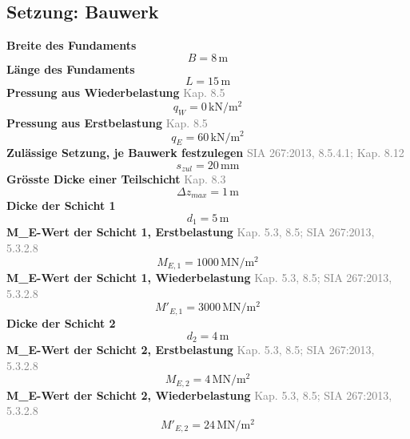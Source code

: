 \documentclass[11pt,a4paper]{article}
\newcommand{\normref}[1]{{\small\textcolor{gray}{#1}}}
\begin{document}
\subsection{Setzung: Bauwerk}
\noindent\textbf{Breite des Fundaments}
\begin{equation*}
B = 8\,\mathrm{m}
\end{equation*}
\noindent\textbf{Länge des Fundaments}
\begin{equation*}
L = 15\,\mathrm{m}
\end{equation*}
\noindent\textbf{Pressung aus Wiederbelastung} \hfill \normref{Kap. 8.5}
\begin{equation*}
q_W = 0\,\mathrm{kN}/\mathrm{m}^{2}
\end{equation*}
\noindent\textbf{Pressung aus Erstbelastung} \hfill \normref{Kap. 8.5}
\begin{equation*}
q_E = 60\,\mathrm{kN}/\mathrm{m}^{2}
\end{equation*}
\noindent\textbf{Zulässige Setzung, je Bauwerk festzulegen} \hfill \normref{SIA 267:2013, 8.5.4.1; Kap. 8.12}
\begin{equation*}
s_{zul} = 20\,\mathrm{mm}
\end{equation*}
\noindent\textbf{Grösste Dicke einer Teilschicht} \hfill \normref{Kap. 8.3}
\begin{equation*}
\Delta z_{max} = 1\,\mathrm{m}
\end{equation*}
\noindent\textbf{Dicke der Schicht 1}
\begin{equation*}
d_{1} = 5\,\mathrm{m}
\end{equation*}
\noindent\textbf{M\_E-Wert der Schicht 1, Erstbelastung} \hfill \normref{Kap. 5.3, 8.5; SIA 267:2013, 5.3.2.8}
\begin{equation*}
M_{E,1} = 1000\,\mathrm{MN}/\mathrm{m}^{2}
\end{equation*}
\noindent\textbf{M\_E-Wert der Schicht 1, Wiederbelastung} \hfill \normref{Kap. 5.3, 8.5; SIA 267:2013, 5.3.2.8}
\begin{equation*}
M'_{E,1} = 3000\,\mathrm{MN}/\mathrm{m}^{2}
\end{equation*}
\noindent\textbf{Dicke der Schicht 2}
\begin{equation*}
d_{2} = 4\,\mathrm{m}
\end{equation*}
\noindent\textbf{M\_E-Wert der Schicht 2, Erstbelastung} \hfill \normref{Kap. 5.3, 8.5; SIA 267:2013, 5.3.2.8}
\begin{equation*}
M_{E,2} = 4\,\mathrm{MN}/\mathrm{m}^{2}
\end{equation*}
\noindent\textbf{M\_E-Wert der Schicht 2, Wiederbelastung} \hfill \normref{Kap. 5.3, 8.5; SIA 267:2013, 5.3.2.8}
\begin{equation*}
M'_{E,2} = 24\,\mathrm{MN}/\mathrm{m}^{2}
\end{equation*}
\end{document}
